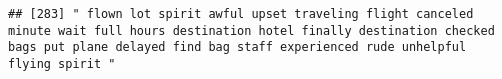 \documentclass[
]{article}
\begin{document}
\begin{verbatim}
## [283] " flown lot spirit awful upset traveling flight canceled minute wait full hours destination hotel finally destination checked bags put plane delayed find bag staff experienced rude unhelpful flying spirit "                                                                                                                                                                                                                                                                                                                                                                                                                                                                                                                                                                                                                                                                                                                                                                                                                                                                                                                                                                                                                                                                                                                                                                                                                                                                                                                                                                                                                                                                                                                                                                                  

\end{verbatim}
\end{document}
